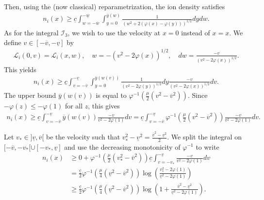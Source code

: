 \documentclass{article}
\numberwithin{equation}{section}
\newcommand{\ve}{{\overline{v}_e}} %
\newcommand{\DomLow}{{\mathcal{D}_3}} %
\newcommand{\IntLow}{{\mathcal{I}_3}} %
\newcommand{\domfel}{{\underline{v}}} %
\newcommand{\domfeu}{{\overline{v}}} %
\newcommand{\minfe}{{\underline{c}}} %
\begin{document}
Then, using the (now classical) reparametrization, the ion density satisfies
\begin{align*}
	n_i(x) \geqslant \minfe \int_{w=-\overline{w}}^{-\underline{w}} \int_{y=0}^{\overline{y}(w)} \frac{1}{\left(w^2 + 2\left(\varphi(x) - \varphi(y)\right)\right)^{1/2}} dy dw.
\end{align*}
As for the integral $\IntLow$, we wish to use the velocity at $x=0$ instead of $x=x$. We define $v\in[-\domfeu,-\domfel]$ by
\begin{align*}
	\mathcal{L}_i(0,v) = \mathcal{L}_i(x,w), \quad w = - \left(v^2 - 2 \varphi(x)\right)^{1/2}, \quad dw = \frac{- v}{\left(v^2 - 2 \varphi(x)\right)^{1/2}}.
\end{align*}
This yields
\begin{align*}
	n_i(x) \geqslant \minfe \int_{v=-\domfeu}^{-\domfel} \int_{y=0}^{\overline{y}(w(v))} \frac{1}{\left(v^2 - 2\varphi(y)\right)^{1/2}} dy  \frac{-v}{\left(v^2 - 2 \varphi(x)\right)^{1/2}} dv.
\end{align*}
The upper bound $\overline{y}(w(v))$ is equal to $\varphi^{-1}\left(\frac{\mu}{2}\left(v^2 - \domfeu^2\right)\right)$.
Since $-\varphi(z) \leqslant -\varphi(1)$ for all $z$, this gives
\begin{align*}
	n_i(x) \geqslant \minfe \int_{v=-\domfeu}^{-\domfel} \overline{y}(w(v)) \frac{-v}{v^2 - 2\varphi(1)} dv = \minfe \int_{v=-\domfeu}^{-\domfel} \varphi^{-1}\left(\frac{\mu}{2}\left(v^2 - \domfeu^2\right)\right) \frac{-v}{v^2 - 2\varphi(1)} dv.
\end{align*}

Let $v_* \in ]\domfel,\domfeu[$ be the velocity such that $v_*^2 - \domfel^2 = \frac{\domfeu^2 - \domfel^2}{2}$. We split the integral on $[-\domfeu,-v_*[ \cup [-v_*,\domfel]$ and use the decreasing monotonicity of $\varphi^{-1}$ to write
\begin{align*}
	n_i(x) 
	&\geqslant 0 + \varphi^{-1}\left(\frac{\mu}{2}\left(v_*^2 - \domfeu^2\right)\right) \minfe \int_{v=-v_*}^{-\domfel} \frac{-v}{v^2 - 2\varphi(1)} dv \\
	&= \frac{\minfe}{2} \varphi^{-1}\left(\frac{\mu}{4}\left(\domfel^2 - \domfeu^2\right)\right) \log\left(\frac{v_*^2 - 2 \varphi(1)}{\domfel^2 - 2 \varphi(1)}\right) \\
	&\geqslant \frac{\minfe}{2} \varphi^{-1}\left(\frac{\mu}{4}\left(\domfel^2 - \domfeu^2\right)\right) \log\left(1 + \frac{\domfeu^2 - \domfel^2}{\domfel^2 - 2 \varphi(1)}\right).
\end{align*}

\fi



%
%
\end{document}
